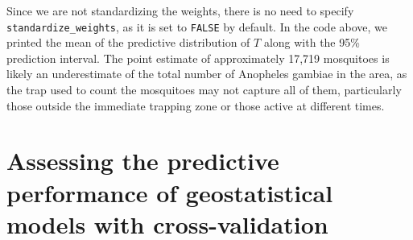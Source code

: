 \documentclass[
  letterpaper,
]{krantz}
\newenvironment{Shaded}{\begin{snugshade}}{\end{snugshade}}
\newcommand{\AttributeTok}[1]{\textcolor[rgb]{0.13,0.29,0.53}{#1}}
\newcommand{\ControlFlowTok}[1]{\textcolor[rgb]{0.13,0.29,0.53}{\textbf{#1}}}
\newcommand{\DocumentationTok}[1]{\textcolor[rgb]{0.56,0.35,0.01}{\textbf{\textit{#1}}}}
\newcommand{\FloatTok}[1]{\textcolor[rgb]{0.00,0.00,0.81}{#1}}
\newcommand{\FunctionTok}[1]{\textcolor[rgb]{0.13,0.29,0.53}{\textbf{#1}}}
\newcommand{\NormalTok}[1]{#1}
\newcommand{\OtherTok}[1]{\textcolor[rgb]{0.56,0.35,0.01}{#1}}
\newcommand{\SpecialCharTok}[1]{\textcolor[rgb]{0.81,0.36,0.00}{\textbf{#1}}}
\begin{document}
\begin{Shaded}
\end{Shaded}

Since we are not standardizing the weights, there is no need to specify
\texttt{standardize\_weights}, as it is set to \texttt{FALSE} by
default. In the code above, we printed the mean of the predictive
distribution of \(T\) along with the 95\% prediction interval. The point
estimate of approximately 17,719 mosquitoes is likely an underestimate
of the total number of Anopheles gambiae in the area, as the trap used
to count the mosquitoes may not capture all of them, particularly those
outside the immediate trapping zone or those active at different times.

\section{Assessing the predictive performance of geostatistical models
with cross-validation}\label{sec-compare-pp}
\end{document}
